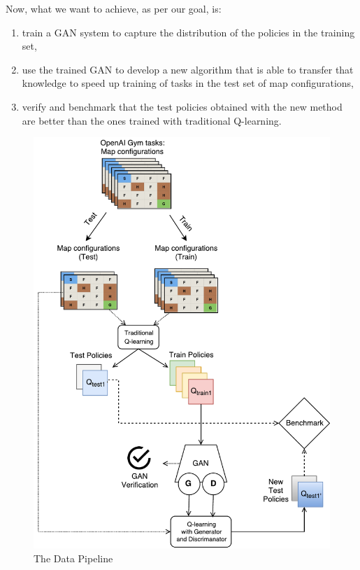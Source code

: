 Now, what we want to achieve, as per our goal, is:
\begin{enumerate}
	\item train a GAN system to capture the distribution of the policies in the training set,
	\item use the trained GAN to develop a new algorithm that is able to transfer that knowledge to speed up training of tasks in the test set of map configurations,
	\item verify and benchmark that the test policies obtained with the new method are better than the ones trained with traditional Q-learning.
\end{enumerate}

\begin{figure}
\centering
\includegraphics[width=13cm]{Figures/Pipeline}
\caption{The Data Pipeline}
\label{fig:pipeline}
\end{figure}


